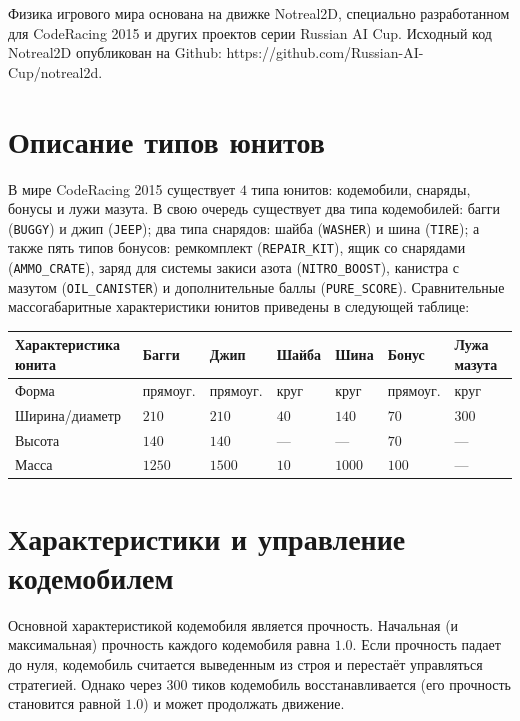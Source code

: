 Физика игрового мира основана на движке Notreal2D, специально разработанном для CodeRacing 2015 и других проектов серии Russian AI Cup.
Исходный код Notreal2D опубликован на Github: https://github.com/Russian-AI-Cup/notreal2d.

\section{Описание типов юнитов}

В мире CodeRacing 2015 существует $4$ типа юнитов: кодемобили, снаряды, бонусы и лужи мазута. В свою очередь существует два типа
кодемобилей: багги (\texttt{BUGGY}) и джип (\texttt{JEEP}); два типа снарядов: шайба (\texttt{WASHER}) и шина (\texttt{TIRE}); а также пять
типов бонусов: ремкомплект (\texttt{REPAIR\_KIT}), ящик со снарядами (\texttt{AMMO\_CRATE}), заряд для системы закиси азота
(\texttt{NITRO\_BOOST}), канистра с мазутом (\texttt{OIL\_CANISTER}) и дополнительные баллы (\texttt{PURE\_SCORE}). Сравнительные
массогабаритные характеристики юнитов приведены в следующей таблице:

\begin{tabular}{| l | l | l | l | l | l | l |}
  \hline
  Характеристика юнита & Багги    & Джип     & Шайба & Шина   & Бонус    & Лужа мазута \\
  \hline
  Форма                & прямоуг. & прямоуг. & круг  & круг   & прямоуг. & круг        \\
  Ширина/диаметр       & $210$    & $210$    & $40$  & $140$  & $70$     & $300$       \\
  Высота               & $140$    & $140$    & ---   & ---    & $70$     & ---         \\
  Масса                & $1250$   & $1500$   & $10$  & $1000$ & $100$    & ---         \\
  \hline
\end{tabular}

\section{Характеристики и управление кодемобилем}

Основной характеристикой кодемобиля является прочность. Начальная (и максимальная) прочность каждого кодемобиля равна $1.0$. Если прочность
падает до нуля, кодемобиль считается выведенным из строя и перестаёт управляться стратегией. Однако через $300$ тиков кодемобиль
восстанавливается (его прочность становится равной $1.0$) и может продолжать движение.


